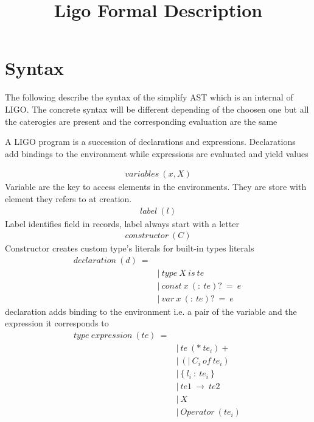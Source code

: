 \documentclass[10pt,a4paper]{article}
\title{Ligo Formal Description}
\author{}
\date{}
\begin{document}
\maketitle
\section*{ Syntax }
The following describe the syntax of the simplify AST which is an internal of LIGO. The concrete syntax will be different depending of the choosen one but all the caterogies are present and the corresponding evaluation are the same

A LIGO program is a succession of declarations and expressions. Declarations add bindings to the environment while expressions are evaluated and yield values

\begin{align*}
variables\ (x,X)
\end{align*}
Variable are the key to access elements in the environments. They are store with element they refers to at creation.
\begin{align*}
label\ (l)
\end{align*}
Label identifies field in records, label always start with a letter
\begin{align*}
constructor\ (C)
\end{align*}
Constructor creates custom type's literals for built-in types literals
\begin{align*}
declaration\ (d)\ = 
\\
 \ &|\ type \ X\ is\ te                    \ \tag{Type\ variable\ declaration}
\\
 \ &|\ const\ x\ (:\ te)?\ =\ e              \ \tag{Term\ Constant\ variable\ declaration}
\\
 \ &|\ var  \ x\ (:\ te)?\ =\ e              \ \tag{Term\ Mutable\ variable\ declaration}
\end{align*}
declaration adds binding to the environment i.e. a pair of the variable and the expression it corresponds to
\begin{align*}
type\ expression\ (te)\ =
\\
 \ &|\ te\ (*\ te_i)+                    \ \tag{type\ of\ tuple}
\\
 \ &|\ (|\ C_i\ of\ te_i)                 \ \tag{type\ of\ sum}
\\
 \ &|\ \{\ l_i\ :\ te_i\ \}                  \ \tag{type\ of\ record}
\\
 \ &|\ te1\ \rightarrow \ te2                      \ \tag{type\ of\ function}
\\
 \ &|\ X                               \ \tag{type\ variable}
\\
 \ &|\ Operator\ (te_i)                 \ \tag{built\ in\ function\ on\ type}
\end{align*}
\end{document}
